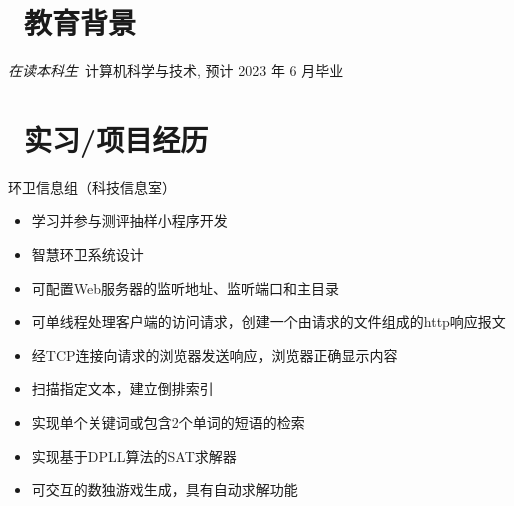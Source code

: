 \documentclass{resume}
\begin{document}


 
\section{\faGraduationCap\  教育背景}
\textit{在读本科生}\ 计算机科学与技术, 预计 2023 年 6 月毕业


\section{\faUsers\ 实习/项目经历}
\role{实习}{指导人: 刘竑}
环卫信息组（科技信息室）
\begin{itemize}
  \item 学习并参与测评抽样小程序开发
  \item 智慧环卫系统设计
\end{itemize}

\begin{onehalfspacing}
\begin{itemize}
  \item 可配置Web服务器的监听地址、监听端口和主目录
  \item 可单线程处理客户端的访问请求，创建一个由请求的文件组成的http响应报文
  \item 经TCP连接向请求的浏览器发送响应，浏览器正确显示内容
\end{itemize}
\end{onehalfspacing}

\begin{onehalfspacing}
\begin{itemize}
  \item 扫描指定文本，建立倒排索引
  \item 实现单个关键词或包含2个单词的短语的检索
\end{itemize}
\end{onehalfspacing}

\begin{onehalfspacing}
\begin{itemize}
  \item 实现基于DPLL算法的SAT求解器
  \item 可交互的数独游戏生成，具有自动求解功能
\end{itemize}
\end{onehalfspacing}
\end{document}
